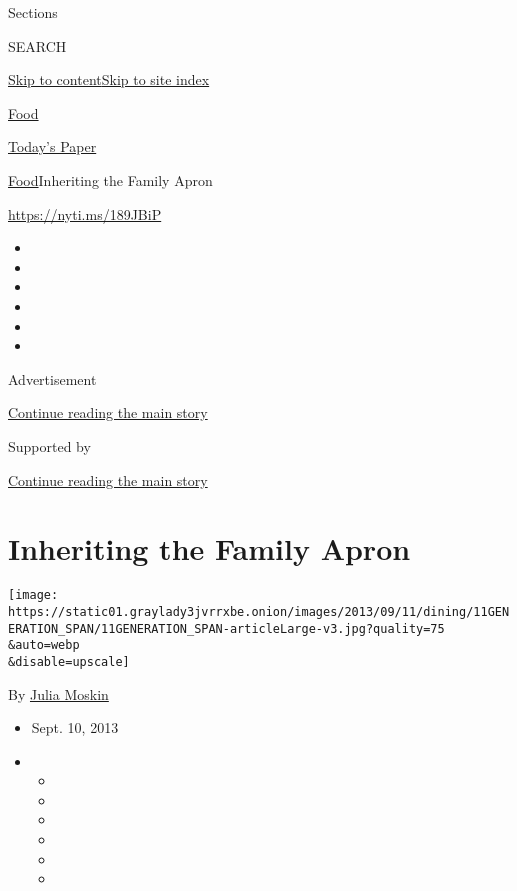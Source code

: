Sections

SEARCH

\protect\hyperlink{site-content}{Skip to
content}\protect\hyperlink{site-index}{Skip to site index}

\href{https://www.nytimes3xbfgragh.onion/section/food}{Food}

\href{https://myaccount.nytimes3xbfgragh.onion/auth/login?response_type=cookie\&client_id=vi}{}

\href{https://www.nytimes3xbfgragh.onion/section/todayspaper}{Today's
Paper}

\href{/section/food}{Food}\textbar{}Inheriting the Family Apron

\url{https://nyti.ms/189JBiP}

\begin{itemize}
\item
\item
\item
\item
\item
\item
\end{itemize}

Advertisement

\protect\hyperlink{after-top}{Continue reading the main story}

Supported by

\protect\hyperlink{after-sponsor}{Continue reading the main story}

\hypertarget{inheriting-the-family-apron}{%
\section{Inheriting the Family
Apron}\label{inheriting-the-family-apron}}

\texttt{[image: https://static01.graylady3jvrrxbe.onion/images/2013/09/11/dining/11GENERATION\_SPAN/11GENERATION\_SPAN-articleLarge-v3.jpg?quality=75\\\&auto=webp\\\&disable=upscale]}

By \href{https://www.nytimes3xbfgragh.onion/by/julia-moskin}{Julia
Moskin}

\begin{itemize}
\item
  Sept. 10, 2013
\item
  \begin{itemize}
  \item
  \item
  \item
  \item
  \item
  \item
  \end{itemize}
\end{itemize}

